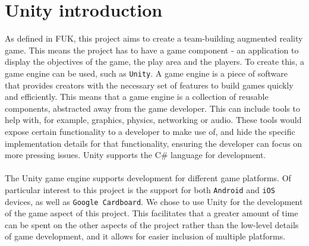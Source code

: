 \section{Unity introduction}
As defined in FUK, this project aims to create a team-building augmented reality game.
This means the project has to have a game component - an application to display the objectives of the game, the play area and the players.
To create this, a game engine can be used, such as \texttt{Unity}.
A game engine is a piece of software that provides creators with the necessary set of features to build games quickly and efficiently\cite{gameengine}.
This means that a game engine is a collection of reusable components, abstracted away from the game developer.
This can include tools to help with, for example, graphics, physics, networking or audio.
These tools would expose certain functionality to a developer to make use of, and hide the specific implementation details for that functionality, ensuring the developer can focus on more pressing issues.
Unity supports the C\# language for development\cite{unitylanguage}.
\\\\
The Unity game engine supports development for different game platforms.
Of particular interest to this project is the support for both \texttt{Android} and \texttt{iOS} devices, as well as \texttt{Google Cardboard}\cite{unityplatforms}.
We chose to use Unity for the development of the game aspect of this project.
This facilitates that a greater amount of time can be spent on the other aspects of the project rather than the low-level details of game development, and it allows for easier inclusion of multiple platforms.


